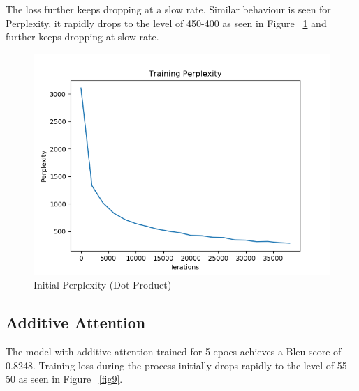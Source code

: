 \documentclass[11pt,a4paper]{article}
\begin{document}
The loss further keeps dropping at a slow rate. Similar behaviour is seen for Perplexity, it rapidly drops to the level of 450-400 as seen in Figure ~\ref{fig7} and further keeps dropping at slow rate.



\begin{figure}[!htbp]
\includegraphics[width=\linewidth]{hi_dot_ppl_1.png}
\caption{Initial Perplexity (Dot Product)}
\label{fig7}
\end{figure}



\subsection{Additive Attention}

The model with additive attention trained for 5 epocs achieves a Bleu score of 0.8248.
Training loss during the process initially drops rapidly to the level of 55 - 50 as seen in Figure ~\ref{fig9}. 
\end{document}
